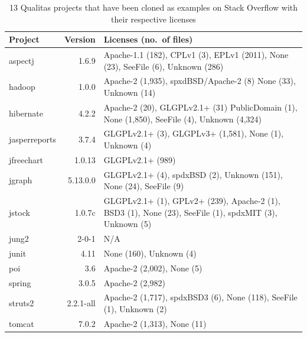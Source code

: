 \documentclass{sig-alternate-05-2015}
\begin{document}
\begin{table}
	\centering
	\caption{13 Qualitas projects that have been cloned as examples on Stack Overflow with their respective licenses}
	\label{t:new_and_old}
	\small
	\begin{tabular}{l|r|p{4cm}}
		\hline 
		Project & Version & Licenses (no.~of files) \\
		\hline
		aspectj & 1.6.9 & Apache-1.1 (182), CPLv1 (3), \newline EPLv1 (2011), None (23), \newline SeeFile (6), Unknown (286) \\
		\hline
		hadoop & 1.0.0 & Apache-2 (1,935), \newline spxdBSD/Apache-2 (8) \newline None (33), Unknown (14) \\
		\hline
		hibernate & 4.2.2 & Apache-2 (20), \newline GLGPLv2.1+ (31) \newline PublicDomain (1), \newline None (1,850), SeeFile (4), \newline Unknown (4,324) \\
		\hline
		jasperreports & 3.7.4 & GLGPLv2.1+ (3), \newline GLGPLv3+ (1,581), \newline None (1), Unknown (4)\\
		\hline
		jfreechart & 1.0.13 & GLGPLv2.1+ (989) \\
		\hline
		jgraph & 5.13.0.0 & GLGPLv2.1+ (4), \newline spdxBSD (2), Unknown (151), \newline None (24), SeeFile (9) \\
		\hline
		jstock & 1.0.7c & GLGPLv2.1+ (1), \newline GPLv2+ (239), \newline Apache-2 (1), BSD3 (1), \newline None (23), SeeFile (1), \newline spdxMIT (3), Unknown (5)\\
		\hline
		jung2 & 2-0-1 & N/A \\
		\hline
		junit & 4.11 & None (160), Unknown (4)  \\
		\hline
		poi & 3.6 & Apache-2 (2,002), None (5) \\
		\hline
		spring & 3.0.5 & Apache-2 (2,982) \\
		\hline
		struts2 & 2.2.1-all & Apache-2 (1,717), \newline spdxBSD3 (6), \newline None (118), SeeFile (1), \newline Unknown (2) \\
		\hline
		tomcat & 7.0.2 & Apache-2 (1,313), None (11) \\
		\hline
	\end{tabular} %
\end{table}
			
\end{document}

